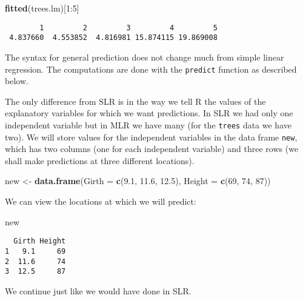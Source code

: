 \documentclass[]{book}
\newenvironment{Shaded}{\begin{snugshade}}{\end{snugshade}}
\newcommand{\KeywordTok}[1]{\textcolor[rgb]{0.13,0.29,0.53}{\textbf{{#1}}}}
\newcommand{\DataTypeTok}[1]{\textcolor[rgb]{0.13,0.29,0.53}{{#1}}}
\newcommand{\DecValTok}[1]{\textcolor[rgb]{0.00,0.00,0.81}{{#1}}}
\newcommand{\FloatTok}[1]{\textcolor[rgb]{0.00,0.00,0.81}{{#1}}}
\newcommand{\StringTok}[1]{\textcolor[rgb]{0.31,0.60,0.02}{{#1}}}
\newcommand{\NormalTok}[1]{{#1}}
\numberwithin{equation}{chapter}
\numberwithin{figure}{chapter}
\theoremstyle{plain}
\theoremstyle{definition}
\theoremstyle{remark}
\theoremstyle{definition}
\theoremstyle{definition}
\theoremstyle{remark}
\begin{document}
\begin{Shaded}
\begin{Highlighting}[]
\KeywordTok{fitted}\NormalTok{(trees.lm)[}\DecValTok{1}\NormalTok{:}\DecValTok{5}\NormalTok{]}
\end{Highlighting}
\end{Shaded}

\begin{verbatim}
        1         2         3         4         5 
 4.837660  4.553852  4.816981 15.874115 19.869008 
\end{verbatim}

The syntax for general prediction does not change much from simple
linear regression. The computations are done with the \texttt{predict}
function as described below.

The only difference from SLR is in the way we tell R the values of the
explanatory variables for which we want predictions. In SLR we had only
one independent variable but in MLR we have many (for the \texttt{trees}
data we have two). We will store values for the independent variables in
the data frame \texttt{new}, which has two columns (one for each
independent variable) and three rows (we shall make predictions at three
different locations).

\begin{Shaded}
\begin{Highlighting}[]
\NormalTok{new <-}\StringTok{ }\KeywordTok{data.frame}\NormalTok{(}\DataTypeTok{Girth =} \KeywordTok{c}\NormalTok{(}\FloatTok{9.1}\NormalTok{, }\FloatTok{11.6}\NormalTok{, }\FloatTok{12.5}\NormalTok{), }
                  \DataTypeTok{Height =} \KeywordTok{c}\NormalTok{(}\DecValTok{69}\NormalTok{, }\DecValTok{74}\NormalTok{, }\DecValTok{87}\NormalTok{))}
\end{Highlighting}
\end{Shaded}

We can view the locations at which we will predict:

\begin{Shaded}
\begin{Highlighting}[]
\NormalTok{new}
\end{Highlighting}
\end{Shaded}

\begin{verbatim}
  Girth Height
1   9.1     69
2  11.6     74
3  12.5     87
\end{verbatim}

We continue just like we would have done in SLR.
\end{document}
